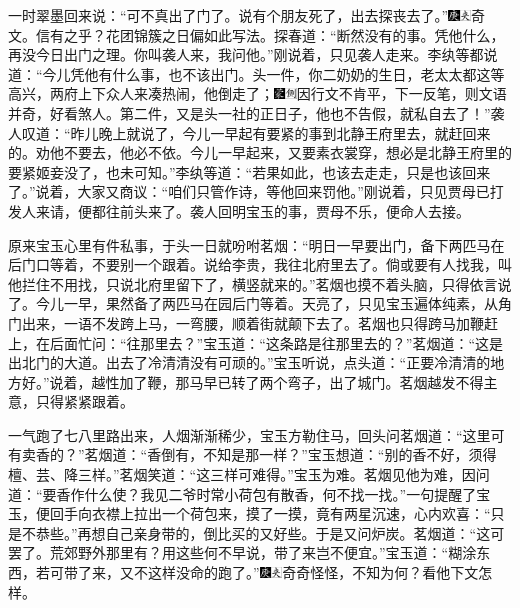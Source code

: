 一时翠墨回来说：“可不真出了门了。说有个朋友死了，出去探丧去了。”{\includegraphics[width=3mm]{../Images/00004}\includegraphics[width=3mm]{../Images/00012}\footnotesize \kaishu 奇文。信有之乎？花团锦簇之日偏如此写法。}探春道：“断然没有的事。凭他什么，再没今日出门之理。你叫袭人来，我问他。”刚说着，只见袭人走来。李纨等都说道：“今儿凭他有什么事，也不该出门。头一件，你二奶奶的生日，老太太都这等高兴，两府上下众人来凑热闹，他倒走了；{\includegraphics[width=3mm]{../Images/00006}\includegraphics[width=3mm]{../Images/00011}\footnotesize \kaishu 因行文不肯平，下一反笔，则文语并奇，好看煞人。}第二件，又是头一社的正日子，他也不告假，就私自去了！”袭人叹道：“昨儿晚上就说了，今儿一早起有要紧的事到北静王府里去，就赶回来的。劝他不要去，他必不依。今儿一早起来，又要素衣裳穿，想必是北静王府里的要紧姬妾没了，也未可知。”李纨等道：“若果如此，也该去走走，只是也该回来了。”说着，大家又商议：“咱们只管作诗，等他回来罚他。”刚说着，只见贾母已打发人来请，便都往前头来了。袭人回明宝玉的事，贾母不乐，便命人去接。

原来宝玉心里有件私事，于头一日就吩咐茗烟：“明日一早要出门，备下两匹马在后门口等着，不要别一个跟着。说给李贵，我往北府里去了。倘或要有人找我，叫他拦住不用找，只说北府里留下了，横竖就来的。”茗烟也摸不着头脑，只得依言说了。今儿一早，果然备了两匹马在园后门等着。天亮了，只见宝玉遍体纯素，从角门出来，一语不发跨上马，一弯腰，顺着街就颠下去了。茗烟也只得跨马加鞭赶上，在后面忙问：“往那里去？”宝玉道：“这条路是往那里去的？”茗烟道：“这是出北门的大道。出去了冷清清没有可顽的。”宝玉听说，点头道：“正要冷清清的地方好。”说着，越性加了鞭，那马早已转了两个弯子，出了城门。茗烟越发不得主意，只得紧紧跟着。

一气跑了七八里路出来，人烟渐渐稀少，宝玉方勒住马，回头问茗烟道：“这里可有卖香的？”茗烟道：“香倒有，不知是那一样？”宝玉想道：“别的香不好，须得檀、芸、降三样。”茗烟笑道：“这三样可难得。”宝玉为难。茗烟见他为难，因问道：“要香作什么使？我见二爷时常小荷包有散香，何不找一找。”一句提醒了宝玉，便回手向衣襟上拉出一个荷包来，摸了一摸，竟有两星沉速，心内欢喜：“只是不恭些。”再想自己亲身带的，倒比买的又好些。于是又问炉炭。茗烟道：“这可罢了。荒郊野外那里有？用这些何不早说，带了来岂不便宜。”宝玉道：“糊涂东西，若可带了来，又不这样没命的跑了。”{\includegraphics[width=3mm]{../Images/00004}\includegraphics[width=3mm]{../Images/00012}\footnotesize \kaishu 奇奇怪怪，不知为何？看他下文怎样。}

